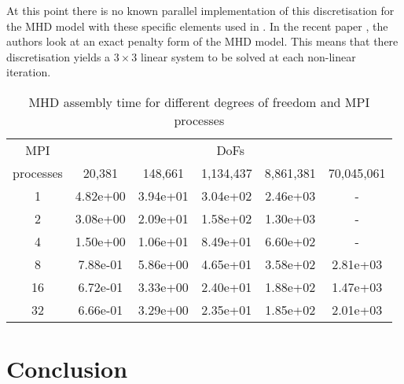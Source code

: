 \documentclass[11pt]{article}
\begin{document}
At this point there is no known parallel implementation of this discretisation for the MHD model with these specific elements used in \cite{schotzau2004mixed}. In the recent paper \cite{phillips2014block}, the authors look at an exact penalty form of the MHD model. This means that there discretisation yields a $3\times3$ linear system to be solved at each non-linear iteration.
\begin{table}[h!]
    \centering
    \begin{tabular}{|c|ccccc|}
        \hline
        MPI & \multicolumn{5}{c|}{DoFs}\\
        processes &  20,381   &   148,661  &   1,134,437  &   8,861,381  & 70,045,061 \\
        \hline
        1 & 4.82e+00 &  3.94e+01 &  3.04e+02 &  2.46e+03 &  - \\
        2 & 3.08e+00 &  2.09e+01 &  1.58e+02 &  1.30e+03 &  - \\
        4 & 1.50e+00 &  1.06e+01 &  8.49e+01 &  6.60e+02 &  - \\
        8 & 7.88e-01 &  5.86e+00 &  4.65e+01 &  3.58e+02 &  2.81e+03 \\
        16 & 6.72e-01 &  3.33e+00 &  2.40e+01 &  1.88e+02 &  1.47e+03 \\
        32 & 6.66e-01 &  3.29e+00 &  2.35e+01 &  1.85e+02 &  2.01e+03 \\
        \hline
    \end{tabular}
    \caption{MHD assembly time for different degrees of freedom and MPI processes}
\end{table}

\section{Conclusion}




\end{document}
